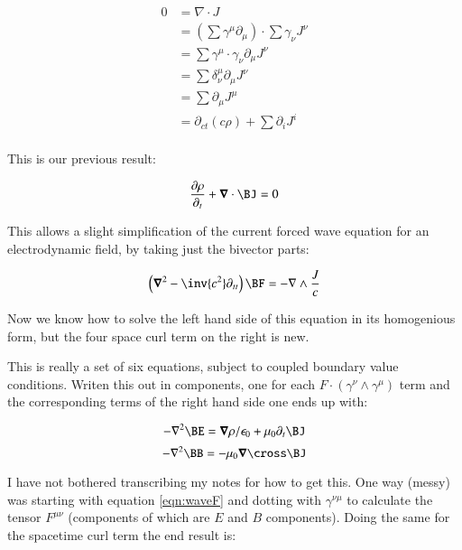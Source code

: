 \documentclass{article}
\newcommand{\spacegrad}[0]{\boldsymbol{\nabla}}
\newcommand{\grad}[0]{\nabla}
\begin{document}
\begin{align*}
0 
&= \grad \cdot J \\
&= (\sum \gamma^{\mu} \partial_{\mu}) \cdot \sum \gamma_{\nu} J^{\nu} \\
&= \sum \gamma^{\mu} \cdot \gamma_{\nu} \partial_{\mu} J^{\nu} \\
&= \sum \delta^{\mu}_{\nu} \partial_{\mu} J^{\nu} \\
&= \sum \partial_{\mu} J^{\mu} \\
&= \partial_{ct}(c \rho) + \sum \partial_{i} J^{i} \\
\end{align*}

This is our previous result:

\begin{equation}
\frac{\partial \rho}{\partial_{t}} + \spacegrad \cdot \BJ = 0
\end{equation}

This allows a slight simplification of the current forced wave equation for an electrodynamic field, by taking just the bivector
parts:

\begin{equation}\label{eqn:waveF}
\left(\spacegrad^2 - \inv{c^2}\partial_{tt}\right) \BF = -\grad \wedge \frac{J}{c}
\end{equation}

Now we know how to solve the left hand side of this equation in its homogenious form, but the four space curl term on the right is
new.

This is really a set of six equations, subject to coupled boundary value conditions.  Writen this out in components, one for each $F \cdot (\gamma^{\nu} \wedge \gamma^{\mu})$ term and the corresponding terms of the right hand side one ends up with:

\begin{equation*}
-\grad^2 \BE = \spacegrad \rho/\epsilon_0 + \mu_0 \partial_t{\BJ}
\end{equation*}
\begin{equation*}
-\grad^2 \BB = -\mu_0 \spacegrad \cross \BJ
\end{equation*}

I have not bothered transcribing my notes for how to get this.  One way (messy) was starting with equation \ref{eqn:waveF} and dotting with $\gamma^{\nu \mu}$ to calculate the tensor $F^{\mu\nu}$ (components of which are $E$ and $B$ components).  Doing the same for the spacetime curl term the end result is:
\end{document}
